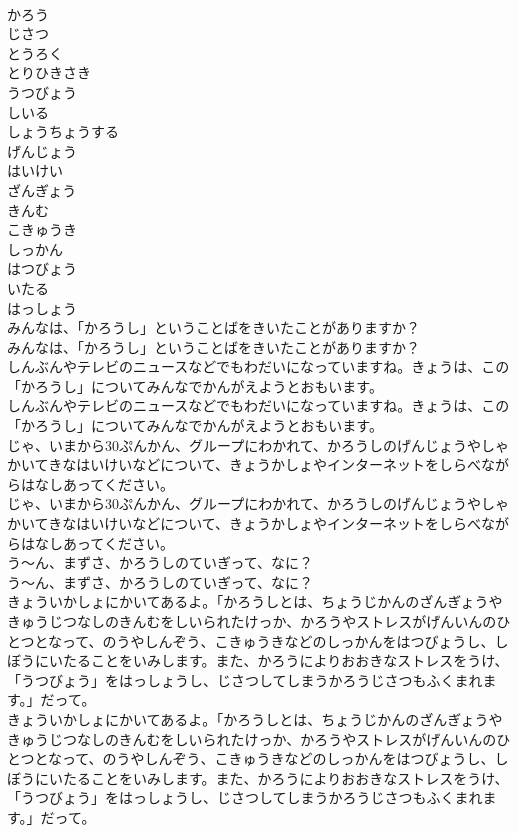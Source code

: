 \documentclass[8pt]{extreport}
\begin{document}
\begin{CJK}{UTF8}{min}
\\	かろう
\\	じさつ
\\	とうろく
\\	とりひきさき
\\	うつびょう
\\	しいる
\\	しょうちょうする
\\	げんじょう
\\	はいけい
\\	ざんぎょう
\\	きんむ
\\	こきゅうき
\\	しっかん
\\	はつびょう
\\	いたる
\\	はっしょう
\\	みんなは、「かろうし」ということばをきいたことがありますか？
\\	みんなは、「かろうし」ということばをきいたことがありますか？
\\	しんぶんやテレビのニュースなどでもわだいになっていますね。きょうは、この「かろうし」についてみんなでかんがえようとおもいます。
\\	しんぶんやテレビのニュースなどでもわだいになっていますね。きょうは、この「かろうし」についてみんなでかんがえようとおもいます。
\\	じゃ、いまから30ぷんかん、グループにわかれて、かろうしのげんじょうやしゃかいてきなはいけいなどについて、きょうかしょやインターネットをしらべながらはなしあってください。
\\	じゃ、いまから30ぷんかん、グループにわかれて、かろうしのげんじょうやしゃかいてきなはいけいなどについて、きょうかしょやインターネットをしらべながらはなしあってください。
\\	う～ん、まずさ、かろうしのていぎって、なに？
\\	う～ん、まずさ、かろうしのていぎって、なに？
\\	きょういかしょにかいてあるよ。「かろうしとは、ちょうじかんのざんぎょうやきゅうじつなしのきんむをしいられたけっか、かろうやストレスがげんいんのひとつとなって、のうやしんぞう、こきゅうきなどのしっかんをはつびょうし、しぼうにいたることをいみします。また、かろうによりおおきなストレスをうけ、「うつびょう」をはっしょうし、じさつしてしまうかろうじさつもふくまれます。」だって。
\\	きょういかしょにかいてあるよ。「かろうしとは、ちょうじかんのざんぎょうやきゅうじつなしのきんむをしいられたけっか、かろうやストレスがげんいんのひとつとなって、のうやしんぞう、こきゅうきなどのしっかんをはつびょうし、しぼうにいたることをいみします。また、かろうによりおおきなストレスをうけ、「うつびょう」をはっしょうし、じさつしてしまうかろうじさつもふくまれます。」だって。

\end{CJK}
\end{document}
